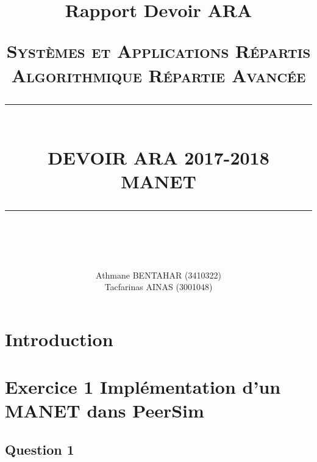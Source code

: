 \documentclass[10pt]{report}
\title{Rapport Devoir ARA}															%
\newcommand{\HRule}[1]{\rule{\linewidth}{#1}}										%
\begin{document}
\title{ \normalsize \textsc{\LARGE {Systèmes et Applications Répartis}\\\Large{Algorithmique Répartie Avancée}}
		\\ [2.0cm]
		\HRule{0.5pt} \\
		\LARGE \textbf{\uppercase{Devoir ARA 2017-2018\\MANET}}
		\HRule{2pt} \\ [0.5cm]
		\normalsize \vspace*{3\baselineskip}}

\author{
		Athmane BENTAHAR (3410322)\\Tacfarinas AINAS (3001048)}

\maketitle
\tableofcontents
\newpage
\sectionfont{\scshape}
\section{Introduction}
\section{Exercice 1  Implémentation d'un MANET dans PeerSim}
\subsection{Question 1}
\end{document}
